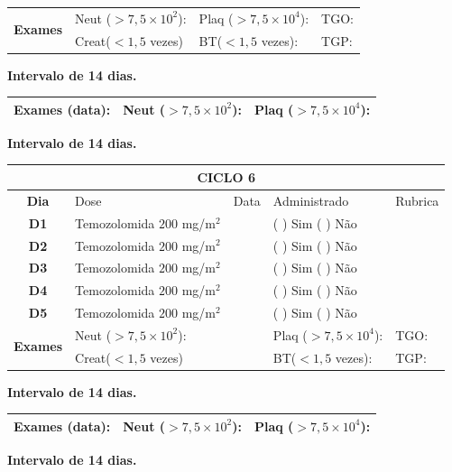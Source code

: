 \documentclass[11pt,a4paper,oldfontcommands]{memoir}
\begin{document}
\begin{center}
\begin{table}[H]
\begin{tabular}{p{1cm}p{5cm}|p{1cm}|p{4.5cm}|p{2cm}}
    \hline
    \multicolumn{1}{c|}{\multirow{2}{*}{\textbf{Exames}}}&\multicolumn{2}{l|}{Neut (\(>7,5\times10^2\)):}&{Plaq (\(>7,5\times10^4\)):}&{TGO:}\\
    \cline{2-5}
    \multicolumn{1}{c|}{\multirow{2}{*}{{}}}&\multicolumn{2}{l|}{Creat(\(<1,5\) vezes)}&{BT(\(<1,5\) vezes):}&{TGP:}
    \\
    \hline
\end{tabular}
\end{table}
\textbf{Intervalo de 14 dias.}
\begin{table}[H]
\begin{tabular}{p{5cm}|p{5cm}|p{4.7cm}}
    \hline
    \textbf{Exames (data):}&{Neut (\(>7,5\times10^2\)):}&{Plaq (\(>7,5\times10^4\)):}
    \\
    \hline
\end{tabular}
\end{table}
\textbf{Intervalo de 14 dias.}
\begin{table}[H]
\begin{tabular}{p{1cm}p{5cm}|p{1cm}|p{4.5cm}|p{2cm}}
	\hline
	\multicolumn{5}{c}{\textbf{CICLO 6}}\\
\hline
    \multicolumn{1}{c|}{\multirow{1}{*}{\textbf{Dia}}}&{Dose}&{Data}&{Administrado}&{Rubrica} \\
    \hline
    \multicolumn{1}{c|}{\multirow{1}{*}{\textbf{D1}}}&{Temozolomida \(200\) mg/m\(^2\)}&&{(  ) Sim (  ) Não}&\\
    \multicolumn{1}{c|}{\multirow{1}{*}{\textbf{D2}}}&{Temozolomida \(200\) mg/m\(^2\)}&&{(  ) Sim (  ) Não}&\\
    \multicolumn{1}{c|}{\multirow{1}{*}{\textbf{D3}}}&{Temozolomida \(200\) mg/m\(^2\)}&&{(  ) Sim (  ) Não}&\\
    \multicolumn{1}{c|}{\multirow{1}{*}{\textbf{D4}}}&{Temozolomida \(200\) mg/m\(^2\)}&&{(  ) Sim (  ) Não}&\\
    \multicolumn{1}{c|}{\multirow{1}{*}{\textbf{D5}}}&{Temozolomida \(200\) mg/m\(^2\)}&&{(  ) Sim (  ) Não}&\\
    \hline
    \multicolumn{1}{c|}{\multirow{2}{*}{\textbf{Exames}}}&\multicolumn{2}{l|}{Neut (\(>7,5\times10^2\)):}&{Plaq (\(>7,5\times10^4\)):}&{TGO:}\\
    \cline{2-5}
    \multicolumn{1}{c|}{\multirow{2}{*}{{}}}&\multicolumn{2}{l|}{Creat(\(<1,5\) vezes)}&{BT(\(<1,5\) vezes):}&{TGP:}
    \\
    \hline
\end{tabular}
\end{table}
\textbf{Intervalo de 14 dias.}
\begin{table}[H]
\begin{tabular}{p{5cm}|p{5cm}|p{4.7cm}}
    \hline
    \textbf{Exames (data):}&{Neut (\(>7,5\times10^2\)):}&{Plaq (\(>7,5\times10^4\)):}
    \\
    \hline
\end{tabular}
\end{table}
\textbf{Intervalo de 14 dias.}


\end{center}
\end{document}
